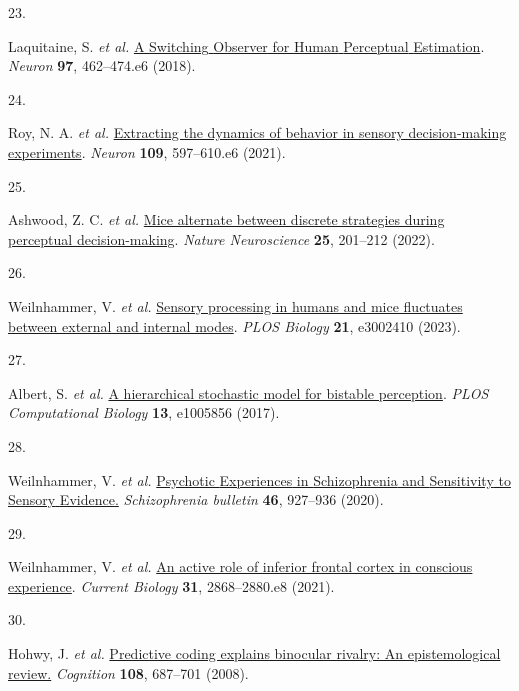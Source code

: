 \documentclass[
]{article}
\newlength{\cslhangindent}
\newlength{\csllabelwidth}
\newenvironment{CSLReferences}[2] %
 {\begin{list}{}{%
  \setlength{\itemindent}{0pt}
  \setlength{\leftmargin}{0pt}
  \setlength{\parsep}{0pt}
  \ifodd #1
   \setlength{\leftmargin}{\cslhangindent}
   \setlength{\itemindent}{-1\cslhangindent}
  \fi
  \setlength{\itemsep}{#2\baselineskip}}}
 {\end{list}}
\newcommand{\CSLLeftMargin}[1]{\parbox[t]{\csllabelwidth}{\strut#1\strut}}
\newcommand{\CSLRightInline}[1]{\parbox[t]{\linewidth - \csllabelwidth}{\strut#1\strut}}
\begin{document}
\begin{CSLReferences}{0}{0}
\CSLLeftMargin{23. }%
\CSLRightInline{Laquitaine, S. \emph{et al.}
\href{https://doi.org/10.1016/j.neuron.2017.12.011}{A {Switching}
{Observer} for {Human} {Perceptual} {Estimation}}. \emph{Neuron}
\textbf{97}, 462--474.e6 (2018).}

\CSLLeftMargin{24. }%
\CSLRightInline{Roy, N. A. \emph{et al.}
\href{https://doi.org/10.1016/J.NEURON.2020.12.004}{Extracting the
dynamics of behavior in sensory decision-making experiments}.
\emph{Neuron} \textbf{109}, 597--610.e6 (2021).}

\CSLLeftMargin{25. }%
\CSLRightInline{Ashwood, Z. C. \emph{et al.}
\href{https://doi.org/10.1038/s41593-021-01007-z}{Mice alternate between
discrete strategies during perceptual decision-making}. \emph{Nature
Neuroscience} \textbf{25}, 201--212 (2022).}

\CSLLeftMargin{26. }%
\CSLRightInline{Weilnhammer, V. \emph{et al.}
\href{https://doi.org/10.1371/journal.pbio.3002410}{Sensory processing
in humans and mice fluctuates between external and internal modes}.
\emph{PLOS Biology} \textbf{21}, e3002410 (2023).}

\CSLLeftMargin{27. }%
\CSLRightInline{Albert, S. \emph{et al.}
\href{https://doi.org/10.1371/journal.pcbi.1005856}{A hierarchical
stochastic model for bistable perception}. \emph{PLOS Computational
Biology} \textbf{13}, e1005856 (2017).}

\CSLLeftMargin{28. }%
\CSLRightInline{Weilnhammer, V. \emph{et al.}
\href{http://www.ncbi.nlm.nih.gov/pubmed/32090246}{Psychotic
{Experiences} in {Schizophrenia} and {Sensitivity} to {Sensory}
{Evidence}.} \emph{Schizophrenia bulletin} \textbf{46}, 927--936
(2020).}

\CSLLeftMargin{29. }%
\CSLRightInline{Weilnhammer, V. \emph{et al.}
\href{https://doi.org/10.1016/j.cub.2021.04.043}{An active role of
inferior frontal cortex in conscious experience}. \emph{Current Biology}
\textbf{31}, 2868--2880.e8 (2021).}

\CSLLeftMargin{30. }%
\CSLRightInline{Hohwy, J. \emph{et al.}
\href{https://doi.org/10.1016/j.cognition.2008.05.010}{Predictive coding
explains binocular rivalry: An epistemological review.} \emph{Cognition}
\textbf{108}, 687--701 (2008).}


\end{CSLReferences}
\end{document}
